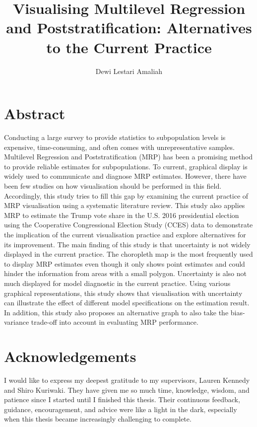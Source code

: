 \documentclass{monashthesis}
\author{Dewi Lestari Amaliah}
\title{Visualising Multilevel Regression and Poststratification: Alternatives to the Current Practice}
\begin{document}

\titlepage

{\sf\tighttoc\doublespacing}

\clearpage{}\setcounter{page}{0}

\hypertarget{abstract}{%
\chapter*{Abstract}\label{abstract}}

Conducting a large survey to provide statistics to subpopulation levels is expensive, time-consuming, and often comes with unrepresentative samples. Multilevel Regression and Poststratification (MRP) has been a promising method to provide reliable estimates for subpopulations. To current, graphical display is widely used to communicate and diagnose MRP estimates. However, there have been few studies on how visualisation should be performed in this field. Accordingly, this study tries to fill this gap by examining the current practice of MRP visualisation using a systematic literature review. This study also applies MRP to estimate the Trump vote share in the U.S. 2016 presidential election using the Cooperative Congressional Election Study (CCES) data to demonstrate the implication of the current visualisation practice and explore alternatives for its improvement. The main finding of this study is that uncertainty is not widely displayed in the current practice. The choropleth map is the most frequently used to display MRP estimates even though it only shows point estimates and could hinder the information from areas with a small polygon. Uncertainty is also not much displayed for model diagnostic in the current practice. Using various graphical representations, this study shows that visualisation with uncertainty can illustrate the effect of different model specifications on the estimation result. In addition, this study also proposes an alternative graph to also take the bias-variance trade-off into account in evaluating MRP performance.

\newpage

\hypertarget{acknowledgements}{%
\chapter*{Acknowledgements}\label{acknowledgements}}

I would like to express my deepest gratitude to my supervisors, Lauren Kennedy and Shiro Kuriwaki. They have given me so much time, knowledge, wisdom, and patience since I started until I finished this thesis. Their continuous feedback, guidance, encouragement, and advice were like a light in the dark, especially when this thesis became increasingly challenging to complete.
\end{document}

